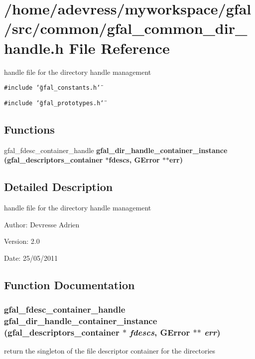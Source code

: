 \section{/home/adevress/myworkspace/gfal/src/common/gfal\_\-common\_\-dir\_\-handle.h File Reference}
\label{gfal__common__dir__handle_8h}
handle file for the directory handle management 

{\tt \#include \char`\"{}gfal\_\-constants.h\char`\"{}}\par
{\tt \#include \char`\"{}gfal\_\-prototypes.h\char`\"{}}\par
\subsection*{Functions}
\begin{CompactItemize}
\item 
gfal\_\-fdesc\_\-container\_\-handle \bf{gfal\_\-dir\_\-handle\_\-container\_\-instance} (gfal\_\-descriptors\_\-container $\ast$fdescs, GError $\ast$$\ast$err)
\end{CompactItemize}


\subsection{Detailed Description}
handle file for the directory handle management 

\begin{Desc}
\item[Author:]Devresse Adrien \end{Desc}
\begin{Desc}
\item[Version:]2.0 \end{Desc}
\begin{Desc}
\item[Date:]25/05/2011 \end{Desc}


\subsection{Function Documentation}
\subsubsection{\setlength{\rightskip}{0pt plus 5cm}gfal\_\-fdesc\_\-container\_\-handle gfal\_\-dir\_\-handle\_\-container\_\-instance (gfal\_\-descriptors\_\-container $\ast$ {\em fdescs}, GError $\ast$$\ast$ {\em err})}\label{gfal__common__dir__handle_8h_0973d623e1abd39d0830739b0710512f}


return the singleton of the file descriptor container for the directories 